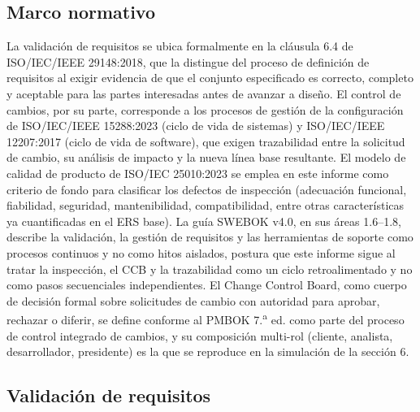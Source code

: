 \documentclass[11pt,a4paper]{article}
\begin{document}
\subsection{Marco normativo}

La validación de requisitos se ubica formalmente en la cláusula 6.4 de
ISO/IEC/IEEE 29148:2018, que la distingue del proceso de definición de requisitos al exigir
evidencia de que el conjunto especificado es correcto, completo y aceptable para las partes
interesadas antes de avanzar a diseño. El control de cambios, por su parte, corresponde a los
procesos de gestión de la configuración de ISO/IEC/IEEE 15288:2023 (ciclo de vida de sistemas) y
ISO/IEC/IEEE 12207:2017 (ciclo de vida de software), que exigen trazabilidad entre la solicitud
de cambio, su análisis de impacto y la nueva línea base resultante. El modelo de calidad de
producto de ISO/IEC 25010:2023 se emplea en este informe como criterio de fondo para clasificar
los defectos de inspección (adecuación funcional, fiabilidad, seguridad, mantenibilidad,
compatibilidad, entre otras características ya cuantificadas en el ERS base). La guía
SWEBOK v4.0, en sus áreas 1.6--1.8, describe la validación, la gestión de requisitos y las
herramientas de soporte como procesos continuos y no como hitos aislados, postura que este
informe sigue al tratar la inspección, el CCB y la trazabilidad como un ciclo retroalimentado y
no como pasos secuenciales independientes. El Change Control Board, como cuerpo de decisión
formal sobre solicitudes de cambio con autoridad para aprobar, rechazar o diferir, se define
conforme al PMBOK 7.\textsuperscript{a} ed. como parte del proceso de control integrado de
cambios, y su composición multi-rol (cliente, analista, desarrollador, presidente) es la que se
reproduce en la simulación de la sección 6.

\subsection{Validación de requisitos}
\end{document}
